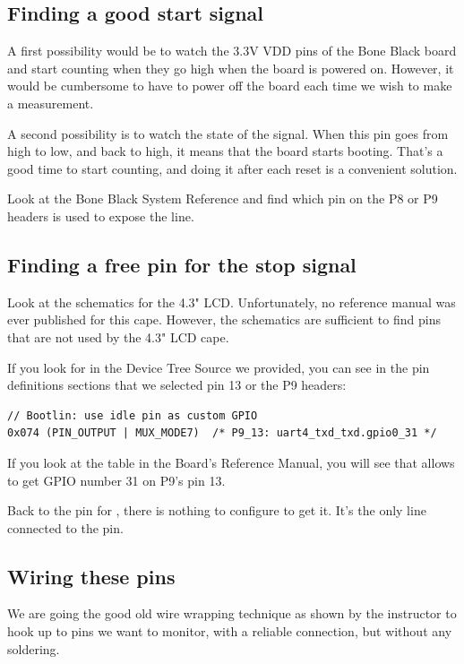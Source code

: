 \subsection{Finding a good start signal}

A first possibility would be to watch the 3.3V VDD pins of the Bone
Black board and start counting when they go high when the board is
powered on. However, it would be cumbersome to have to power off the
board each time we wish to make a measurement.

A second possibility is to watch the state of the  signal.
When this pin goes from high to low, and back to high, it means that the
board starts booting. That's a good time to start counting, and doing
it after each reset is a convenient solution.

Look at the Bone Black System Reference and find which pin on the P8 or
P9 headers is used to expose the  line.

\subsection{Finding a free pin for the stop signal}

Look at the schematics for the 4.3" LCD. Unfortunately, no reference
manual was ever published for this cape. However, the schematics are
sufficient to find pins that are not used by the 4.3" LCD cape.

If you look for  in the Device Tree Source we provided,
you can see in the pin definitions sections that we selected pin 13 or
the P9 headers:

\begin{verbatim}
// Bootlin: use idle pin as custom GPIO
0x074 (PIN_OUTPUT | MUX_MODE7)  /* P9_13: uart4_txd_txd.gpio0_31 */
\end{verbatim}

If you look at the  table in the
Board's Reference Manual, you will see that  allows to get
GPIO number 31 on P9's pin 13.

Back to the pin for , there is nothing to configure to
get it. It's the only line connected to the pin.

\subsection{Wiring these pins}

We are going the good old wire wrapping technique as shown by the
instructor to hook up to pins we want to monitor, with a reliable
connection, but without any soldering.

